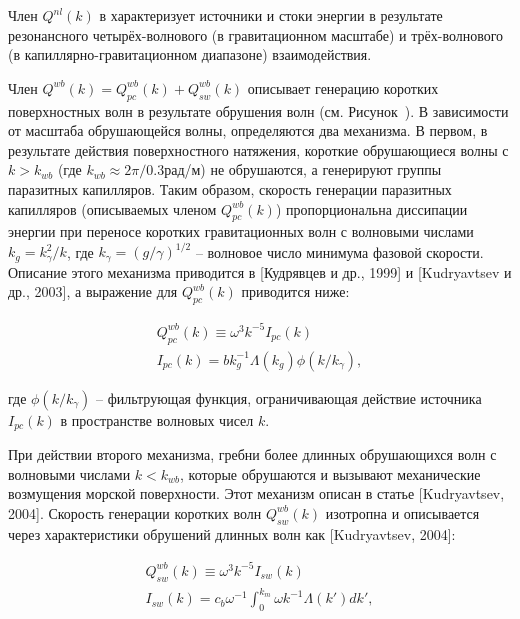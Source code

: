 Член $Q^{nl} (k)$ в  характеризует источники и стоки энергии в результате резонансного четырёх-волнового (в гравитационном масштабе) и трёх-волнового (в капиллярно-гравитационном диапазоне) взаимодействия.

Член $Q^{wb} (k)=Q_{pc}^{wb} (k)+Q_{sw}^{wb} (k)$ описывает генерацию коротких поверхностных волн в результате обрушения волн (см. Рисунок~). В зависимости от масштаба обрушающейся волны, определяются два механизма. В первом, в результате действия поверхностного натяжения, короткие обрушающиеся волны с $k>k_{wb} $ (где $k_{wb} \approx 2\pi /0.3$рад/м) не обрушаются, а генерируют группы паразитных капилляров. Таким образом, скорость генерации паразитных капилляров (описываемых членом $Q_{pc}^{wb} (k)$) пропорциональна диссипации энергии при переносе коротких гравитационных волн с волновыми числами $k_{g} =k_{\gamma }^{2} /k$, где $k_{\gamma } =(g/\gamma )^{1/2} $ -- волновое число минимума фазовой скорости. Описание этого механизма приводится в [Кудрявцев и др., 1999] и [Kudryavtsev и др., 2003], а выражение для $Q_{pc}^{wb} (k)$ приводится ниже:



\begin{equation} \label{1.34)} \begin{array}{l} {Q_{pc}^{wb} (k)\equiv \omega ^{3} k^{-5} I_{pc} (k)} \\ {I_{pc} (k)=bk_{g}^{-1} \Lambda (k_{g} )\phi (k/k_{\gamma } ),} \end{array} \end{equation} 



\noindent где $\phi (k/k_{\gamma } )$ -- фильтрующая функция, ограничивающая действие источника $I_{pc} (k)$ в пространстве волновых чисел $k$.

При действии второго механизма, гребни более длинных обрушающихся волн с волновыми числами $k<k_{wb} $, которые обрушаются и вызывают механические возмущения морской поверхности. Этот механизм описан в статье [Kudryavtsev, 2004]. Скорость генерации коротких волн $Q_{sw}^{wb} (k)$ изотропна и описывается через характеристики обрушений длинных волн как [Kudryavtsev, 2004]:



\begin{equation} \label{1.35)} \begin{array}{l} {Q_{sw}^{wb} (k)\equiv \omega ^{3} k^{-5} I_{sw} (k)} \\ {I_{sw} (k)=c_{b} \omega ^{-1} \int _{0}^{k_{m} }\omega k^{-1} \Lambda (k')dk' ,} \end{array} \end{equation} 



